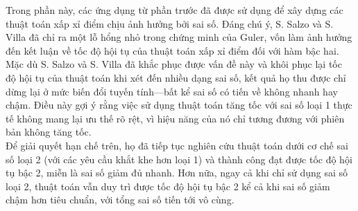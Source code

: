 \begin{essayonly}
Trong phần này, các ứng dụng từ phần trước đã được sử dụng để xây dựng các thuật toán xấp xỉ điểm chịu ảnh hưởng bởi sai số. Đáng chú ý, S. Salzo và S. Villa đã chỉ ra một lỗ hổng nhỏ trong chứng minh của Guler, vốn làm ảnh hưởng đến kết luận về tốc độ hội tụ của thuật toán xấp xỉ điểm đối với hàm bậc hai.
\\
Mặc dù S. Salzo và S. Villa đã khắc phục được vấn đề này và khôi phục lại tốc độ hội tụ của thuật toán khi xét đến nhiều dạng sai số, kết quả họ thu được chỉ dừng lại ở mức biến đổi tuyến tính—bất kể sai số có tiến về không nhanh hay chậm. Điều này gợi ý rằng việc sử dụng thuật toán tăng tốc với sai số loại 1 thực tế không mang lại ưu thế rõ rệt, vì hiệu năng của nó chỉ tương đương với phiên bản không tăng tốc.
\\
Để giải quyết hạn chế trên, họ đã tiếp tục nghiên cứu thuật toán dưới cơ chế sai số loại 2 (với các yêu cầu khắt khe hơn loại 1) và thành công đạt được tốc độ hội tụ bậc 2, miễn là sai số giảm đủ nhanh. Hơn nữa, ngay cả khi chỉ sử dụng sai số loại 2, thuật toán vẫn duy trì được tốc độ hội tụ bậc 2 kể cả khi sai số giảm chậm hơn tiêu chuẩn, với tổng sai số tiến tới vô cùng.
\end{essayonly}